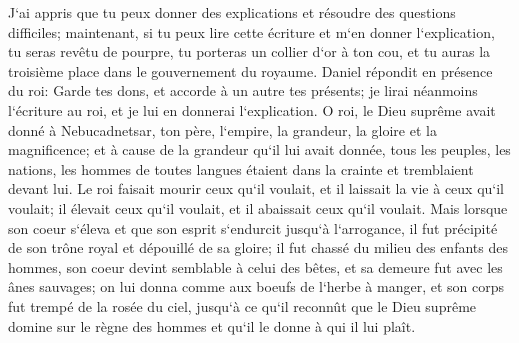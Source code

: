 \verse J`ai appris que tu peux donner des explications et résoudre des questions difficiles; maintenant, si tu peux lire cette écriture et m`en donner l`explication, tu seras revêtu de pourpre, tu porteras un collier d`or à ton cou, et tu auras la troisième place dans le gouvernement du royaume. 
\verse Daniel répondit en présence du roi: Garde tes dons, et accorde à un autre tes présents; je lirai néanmoins l`écriture au roi, et je lui en donnerai l`explication. 
\verse O roi, le Dieu suprême avait donné à Nebucadnetsar, ton père, l`empire, la grandeur, la gloire et la magnificence; 
\verse et à cause de la grandeur qu`il lui avait donnée, tous les peuples, les nations, les hommes de toutes langues étaient dans la crainte et tremblaient devant lui. Le roi faisait mourir ceux qu`il voulait, et il laissait la vie à ceux qu`il voulait; il élevait ceux qu`il voulait, et il abaissait ceux qu`il voulait. 
\verse Mais lorsque son coeur s`éleva et que son esprit s`endurcit jusqu`à l`arrogance, il fut précipité de son trône royal et dépouillé de sa gloire; 
\verse il fut chassé du milieu des enfants des hommes, son coeur devint semblable à celui des bêtes, et sa demeure fut avec les ânes sauvages; on lui donna comme aux boeufs de l`herbe à manger, et son corps fut trempé de la rosée du ciel, jusqu`à ce qu`il reconnût que le Dieu suprême domine sur le règne des hommes et qu`il le donne à qui il lui plaît. 
